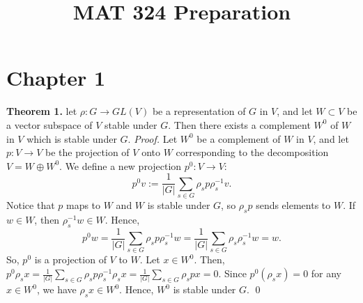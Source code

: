 \documentclass{article}
\title{MAT 324 Preparation}
\date{}
\begin{document}
\section*{Chapter 1}
\textbf{Theorem 1. } let $\rho:G\rightarrow GL(V)$ be a representation of $G$ in $V$, and let $W\subset V$ be a vector subspace of $V$ stable under $G$. Then there exists a complement $W^0$ of $W$ in $V$ which is stable under $G$.
\newline
\newline
\textit{Proof.} Let $W^0$ be a complement of $W$ in $V$, and let $p:V\rightarrow V$ be the projection of $V$ onto $W$ corresponding to the decomposition $V=W\oplus W^0$. We define a new projection $p^0:V\rightarrow V$:
\begin{equation*}
    p^0v:=\frac1{|G|}\sum_{s\in G}\rho_s p\rho_s^{-1}v.
\end{equation*}
Notice that $p$ maps to $W$ and $W$ is stable under $G$, so $\rho_sp$ sends elements to $W$. If $w\in W$, then $\rho_s^{-1}w\in W$. Hence,
\begin{equation*}
    p^0w=\frac1{|G|}\sum_{s\in G}\rho_s p\rho_s^{-1}w=\frac1{|G|}\sum_{s\in G}\rho_s \rho_s^{-1}w=w.
\end{equation*} 
So, $p^0$ is a projection of $V$ to $W$.
\newline
\newline
Let $x\in W^0$. Then, $p^0\rho_s x=\frac1{|G|}\sum_{s\in G}\rho_s p\rho_s^{-1}\rho_s x=\frac1{|G|}\sum_{s\in G}\rho_s px=0$. Since $p^0(\rho_s x)=0$ for any $x\in W^0$, we have $\rho_s x\in W^0$. Hence, $W^0$ is stable under $G$. \qed
\end{document}
